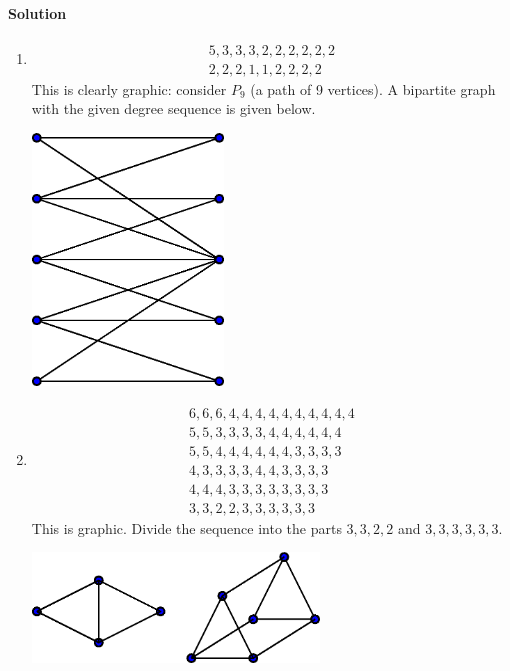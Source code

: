 \documentclass[10pt]{article}
\newcommand{\solution}{\paragraph{Solution}}
\begin{document}
    \solution 
    \begin{enumerate}
        \item \begin{align*}
            5, 3, 3, 3, 2, 2, 2, 2, 2, 2 \\
            2, 2, 2, 1, 1, 2, 2, 2, 2
        \end{align*}
        This is clearly graphic: consider $P_9$ (a path of 9 vertices). A bipartite
        graph with the given degree sequence is given below.

        \begin{center}
            \includegraphics[width=0.4\textwidth]{./bipartite_13_1.eps}
        \end{center}

        \item \begin{align*}
            6, 6, 6, 4, 4, 4, 4, 4, 4, 4, 4, 4, 4 \\
            5, 5, 3, 3, 3, 3, 4, 4, 4, 4, 4, 4 \\
            5, 5, 4, 4, 4, 4, 4, 4, 3, 3, 3, 3 \tag{Reorder} \\
            4, 3, 3, 3, 3, 4, 4, 3, 3, 3, 3 \\
            4, 4, 4, 3, 3, 3, 3, 3, 3, 3, 3 \tag{Reorder} \\
            3, 3, 2, 2, 3, 3, 3, 3, 3, 3
        \end{align*}
        This is graphic. Divide the sequence into the parts $3, 3, 2, 2$ and $3, 3,
        3, 3, 3, 3$.
        
        \begin{center}
            \includegraphics[width=0.6\textwidth]{./graph_13_2.eps}
        \end{center}
        

\end{enumerate}
\end{document}
